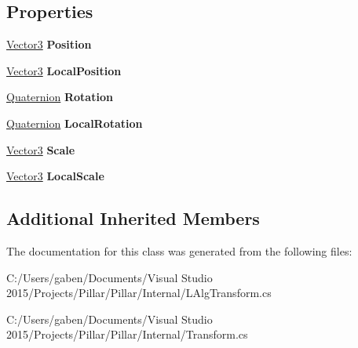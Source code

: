 \subsection*{Properties}
\begin{DoxyCompactItemize}
\item 
\mbox{\label{class_pillar3_d_1_1_transform_a8b02658be952e1ded6862366dc688255}} 
\hyperlink{class_pillar3_d_1_1_vector3}{Vector3} {\bfseries Position}
\item 
\mbox{\label{class_pillar3_d_1_1_transform_a79f83ccc5295de3d82c652ae2d266d41}} 
\hyperlink{class_pillar3_d_1_1_vector3}{Vector3} {\bfseries Local\+Position}
\item 
\mbox{\label{class_pillar3_d_1_1_transform_aa66155413ef70fc432926aac718c3a0f}} 
\hyperlink{class_pillar3_d_1_1_quaternion}{Quaternion} {\bfseries Rotation}
\item 
\mbox{\label{class_pillar3_d_1_1_transform_a7afa852af6c0e0474b958042f2c5a1fb}} 
\hyperlink{class_pillar3_d_1_1_quaternion}{Quaternion} {\bfseries Local\+Rotation}
\item 
\mbox{\label{class_pillar3_d_1_1_transform_a7f6547c7e5337b35cff885df24378e9a}} 
\hyperlink{class_pillar3_d_1_1_vector3}{Vector3} {\bfseries Scale}
\item 
\mbox{\label{class_pillar3_d_1_1_transform_ac59c67249ec0fc49c080a5c92131e169}} 
\hyperlink{class_pillar3_d_1_1_vector3}{Vector3} {\bfseries Local\+Scale}
\end{DoxyCompactItemize}
\subsection*{Additional Inherited Members}


The documentation for this class was generated from the following files\+:\begin{DoxyCompactItemize}
\item 
C\+:/\+Users/gaben/\+Documents/\+Visual Studio 2015/\+Projects/\+Pillar/\+Pillar/\+Internal/L\+Alg\+Transform.\+cs\item 
C\+:/\+Users/gaben/\+Documents/\+Visual Studio 2015/\+Projects/\+Pillar/\+Pillar/\+Internal/Transform.\+cs\end{DoxyCompactItemize}

